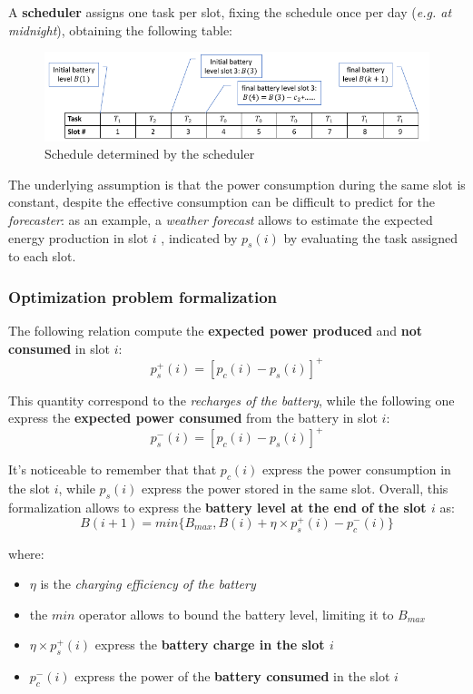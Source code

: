 \documentclass[10pt,a4paper]{report}
\theoremstyle{definition}
\begin{document}
A \textbf{scheduler} assigns one task per slot, fixing the schedule once per day (\textit{e.g. at midnight}), obtaining the following table:
\begin{figure}[h]
	\centering\includegraphics[scale=0.50]{images/Pasted image 20230514104854.png}	\caption{Schedule determined by the scheduler}
\end{figure}


The underlying assumption is that the power consumption during the same slot is constant, despite the effective consumption can be difficult to predict for the \textit{forecaster}: as an example, a \textit{weather forecast} allows to estimate the expected energy production in slot $i$ , indicated by $p_{s}(i)$ by evaluating the task assigned to each slot.
\subsubsection{Optimization problem formalization}\label{sec:optimization-problem-formalization}
The following relation compute the \textbf{expected power produced} and \textbf{not consumed} in slot $i$:
\begin{equation}
	p_{s}^{+}(i) = [p_{c}(i) - p_{s}(i)]^{+}
\end{equation}

This quantity correspond to the \textit{recharges of the battery}, while the following one express the \textbf{expected power consumed} from the battery in slot $i$:
\begin{equation}
	p_{s}^{-}(i) = [p_{c}(i) - p_{s}(i)]^{+}
\end{equation}

It's noticeable to remember that that $p_{c}(i)$ express the power consumption in the slot $i$, while $p_{s}(i)$ express the power stored in the same slot.
Overall, this formalization allows to express the \textbf{battery level at the end of the slot $i$} as:
\begin{equation}
B(i+1) = min\{B_{max}, B(i)+\eta \times p_{s}^{+}(i) - p_{c}^{-}(i)\}
\end{equation}

where:
\begin{itemize}
	\item 
	$\eta$ is the \textit{charging efficiency of the battery}
	\item 
	the $min$ operator allows to bound the battery level, limiting it to $B_{max}$
	\item 
	$\eta \times p_{s}^{+}(i)$ express the \textbf{battery charge in the slot $i$}
	\item 
	$p_{c}^{-}(i)$ express the power of the \textbf{battery consumed} in the slot $i$
\end{itemize}
\end{document}
